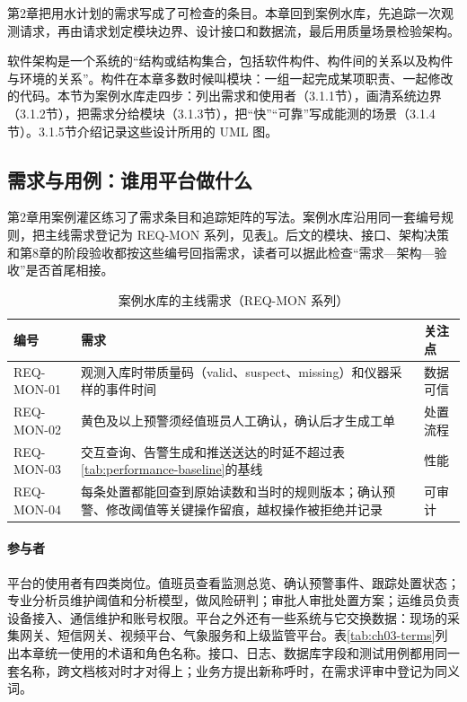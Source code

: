 第2章把用水计划的需求写成了可检查的条目。本章回到案例水库，先追踪一次观测请求，再由请求划定模块边界、设计接口和数据流，最后用质量场景检验架构。


软件架构是一个系统的“结构或结构集合，包括软件构件、构件间的关系以及构件与环境的关系”\cite{ISO42010,clements2010,richards2020,shaw1996}。构件在本章多数时候叫模块：一组一起完成某项职责、一起修改的代码。本节为案例水库走四步：列出需求和使用者（3.1.1节），画清系统边界（3.1.2节），把需求分给模块（3.1.3节），把“快”“可靠”写成能测的场景（3.1.4节）。3.1.5节介绍记录这些设计所用的 UML 图。

\subsection{需求与用例：谁用平台做什么}

第2章用案例灌区练习了需求条目和追踪矩阵的写法。案例水库沿用同一套编号规则，把主线需求登记为 REQ-MON 系列，见表\ref{tab:ch03-req-mon}。后文的模块、接口、架构决策和第8章的阶段验收都按这些编号回指需求，读者可以据此检查“需求—架构—验收”是否首尾相接。

\begin{table}[htbp]
\centering
\caption{案例水库的主线需求（REQ-MON 系列）}
\label{tab:ch03-req-mon}
\begin{tabular}{p{2.2cm}p{8.2cm}p{3.0cm}}
\toprule
编号 & 需求 & 关注点 \\
\midrule
REQ-MON-01 & 观测入库时带质量码（valid、suspect、missing）和仪器采样的事件时间 & 数据可信 \\
REQ-MON-02 & 黄色及以上预警须经值班员人工确认，确认后才生成工单 & 处置流程 \\
REQ-MON-03 & 交互查询、告警生成和推送送达的时延不超过表\ref{tab:performance-baseline}的基线 & 性能 \\
REQ-MON-04 & 每条处置都能回查到原始读数和当时的规则版本；确认预警、修改阈值等关键操作留痕，越权操作被拒绝并记录 & 可审计 \\
\bottomrule
\end{tabular}
\end{table}

\paragraph{参与者}平台的使用者有四类岗位。值班员查看监测总览、确认预警事件、跟踪处置状态；专业分析员维护阈值和分析模型，做风险研判；审批人审批处置方案；运维员负责设备接入、通信维护和账号权限。平台之外还有一些系统与它交换数据：现场的采集网关、短信网关、视频平台、气象服务和上级监管平台。表\ref{tab:ch03-terms}列出本章统一使用的术语和角色名称。接口、日志、数据库字段和测试用例都用同一套名称，跨文档核对时才对得上；业务方提出新称呼时，在需求评审中登记为同义词。


